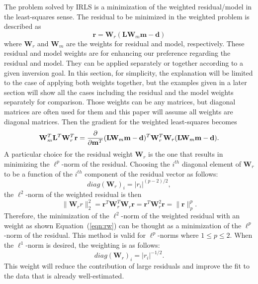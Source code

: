The problem solved by IRLS is a minimization of the weighted residual/model 
in the least-squares sense. The residual to be minimized in the weighted problem 
is described as \begin{equation}
\mathbf r = \mathbf W_r (\mathbf L \mathbf W_m \mathbf m - \mathbf d)
\end{equation}
where $\mathbf W_r$ and $\mathbf W_m$ are the weights for residual and model, respectively.
These residual and model weights are for enhancing our preference regarding
the residual and model. 
They can be applied separately or together according to a given inversion goal. 
In this section, for simplicity, the explanation will be limited 
to the case of applying both weights together,
but the examples given in a later section will show all the cases 
including the residual and the model weights separately for comparison.
Those weights can be any matrices, but diagonal matrices are often used for them 
and this paper will assume all weights are diagonal matrices.
Then the gradient for the weighted least-squares becomes 
\begin{equation}
\mathbf W_m^T \mathbf L^T \mathbf W_r^T \mathbf r = 
{\partial \over \partial \mathbf m^T} 
(\mathbf L \mathbf W_m \mathbf m -\mathbf d)^T\mathbf W_r^T\mathbf W_r(\mathbf L \mathbf W_m\mathbf m -\mathbf d) .
\end{equation}
A particular choice for the residual weight $\mathbf W_r$ is the one 
that results in minimizing the $\ell^p$-norm of the residual. 
Choosing the $i^{th}$ diagonal element of $\mathbf W_r$
to be a function of the $i^{th}$ component of the residual vector
as follows:
\begin{equation}
diag ({\mathbf W_r})_i = |r_i|^{(p-2)/2},
\label{eqn:rw}
\end{equation}
the $\ell^2$-norm of the weighted residual is then
\begin{equation}
\|\mathbf W_r r\|_2^2
= \mathbf r^T \mathbf W_r^T \mathbf W_r \mathbf r 
= \mathbf r^T \mathbf W_r^2 \mathbf r = \|\mathbf r\|_p^p  .
\end{equation}
Therefore, the minimization of the $\ell^2$-norm of the weighted residual 
with an weight as shown Equation~(\ref{eqn:rw})
can be thought as a minimization of the $\ell^p$-norm of the residual.
This method is valid for $\ell^p$-norms where $1 \le p \le 2$. 
When the $\ell^1$-norm is desired, the weighting is as follows:
$$ diag({\mathbf W_r})_i = |r_i|^{-1/2}.$$
This weight will reduce the contribution of large residuals
and improve the fit to the data that is already well-estimated.
